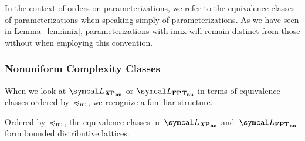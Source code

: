 In the context of orders on parameterizations, we refer to the equivalence classes of parameterizations when speaking simply of parameterizations.
As we have seen in Lemma~\ref{lem:imix}, parameterizations with imix will remain distinct from those without when employing this convention.

\subsubsection{Nonuniform Complexity Classes}
When we look at $\calL_\clXnu{P}$ or $\calL_\clnu{FPT}$ in terms of equivalence classes ordered by~$\preccurlyeq_\mathrm{nu}$, we recognize a familiar \parencite{davey2002introduction} structure.
\begin{theorem}
\label{thm:nulattice}%
  Ordered by~$\preccurlyeq_\mathrm{nu}$, the equivalence classes in~$\calL_\clXnu{P}$ and~$\calL_\clnu{FPT}$ form bounded distributive lattices.
\end{theorem}
